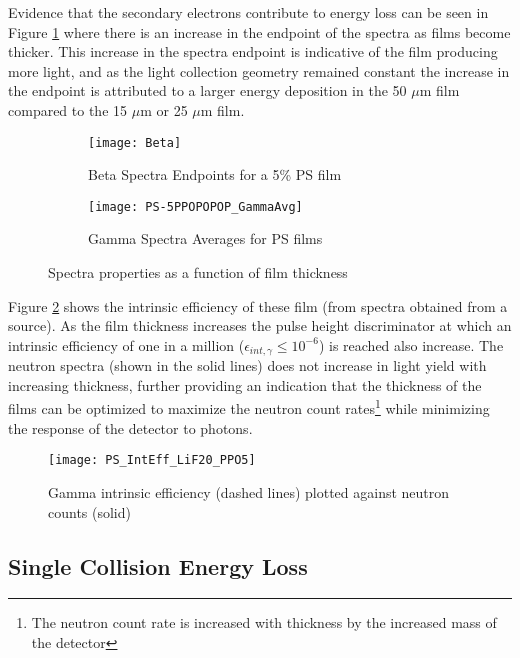 Evidence that the secondary electrons contribute to energy loss can be seen in Figure \ref{fig:SpectraFeatures} where there is an increase in the endpoint of the spectra as films become thicker.
This increase in the spectra endpoint is indicative of the film producing more light, and as the light collection geometry remained constant the increase in the endpoint is attributed to a larger energy deposition in the 50 $\mu$m film compared to the 15 $\mu$m or 25 $\mu$m film.
\begin{figure}[h]
    \centering
    \begin{subfigure}[b]{0.45\figurewidth}
        \texttt{[image: Beta]}
        \caption{Beta Spectra Endpoints for a 5\% PS film}
    \end{subfigure}
    \begin{subfigure}[b]{0.45\figurewidth}
        \texttt{[image: PS-5PPOPOPOP\_GammaAvg]}
        \caption{Gamma Spectra Averages for PS films}
    \end{subfigure}
    \caption{Spectra properties as a function of film thickness}
    \label{fig:SpectraFeatures}
\end{figure}
Figure \ref{fig:GammaIntrNeutronCounts} shows the intrinsic efficiency of these film (from spectra obtained from a  source).
As the film thickness increases the pulse height discriminator at which an intrinsic efficiency of one in a million ($\epsilon_{int,\gamma} \le 10^{-6}$) is reached also increase.
The neutron spectra (shown in the solid lines) does not increase in light yield with increasing thickness, further providing an indication that the thickness of the films can be optimized to maximize the neutron count rates\footnote{The neutron count rate is increased with thickness by the increased mass of the detector} while minimizing the response of the detector to photons.
\begin{figure}[ht]
    \centering
    \texttt{[image: PS\_IntEff\_LiF20\_PPO5]}
    \caption{Gamma intrinsic efficiency (dashed lines) plotted against neutron counts (solid)}
    \label{fig:GammaIntrNeutronCounts}
\end{figure}

\subsection{Single Collision Energy Loss}

